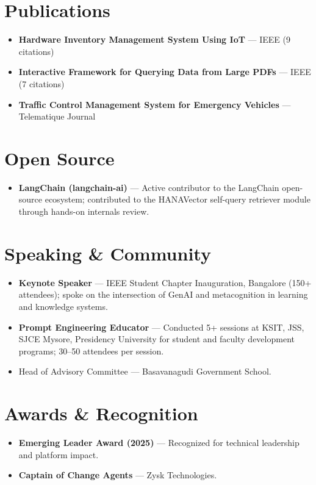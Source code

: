 \documentclass[letterpaper,11pt]{article}
\newcommand{\resumeItem}[1]{
  \item\small{
    {#1 \vspace{-2pt}}
  }
}
\newcommand{\resumeSubItem}[1]{\resumeItem{#1}\vspace{-4pt}}
\newcommand{\resumeSubHeadingListStart}{\begin{itemize}[leftmargin=0.15in, label={}]}
\newcommand{\resumeSubHeadingListEnd}{\end{itemize}}
\begin{document}
\section{Publications}
  \resumeSubHeadingListStart
    \resumeSubItem{\textbf{Hardware Inventory Management System Using IoT} --- IEEE (9 citations)}
    \resumeSubItem{\textbf{Interactive Framework for Querying Data from Large PDFs} --- IEEE (7 citations)}
    \resumeSubItem{\textbf{Traffic Control Management System for Emergency Vehicles} --- Telematique Journal}
  \resumeSubHeadingListEnd

\section{Open Source}
  \resumeSubHeadingListStart
    \resumeSubItem{\textbf{LangChain (langchain-ai)} --- Active contributor to the LangChain open-source ecosystem; contributed to the HANAVector self-query retriever module through hands-on internals review.}
  \resumeSubHeadingListEnd

\section{Speaking \& Community}
  \resumeSubHeadingListStart
    \resumeSubItem{\textbf{Keynote Speaker} --- IEEE Student Chapter Inauguration, Bangalore (150+ attendees); spoke on the intersection of GenAI and metacognition in learning and knowledge systems.}
    \resumeSubItem{\textbf{Prompt Engineering Educator} --- Conducted 5+ sessions at KSIT, JSS, SJCE Mysore, Presidency University for student and faculty development programs; 30--50 attendees per session.}
    \resumeSubItem{Head of Advisory Committee --- Basavanagudi Government School.}
  \resumeSubHeadingListEnd

\section{Awards \& Recognition}
  \resumeSubHeadingListStart
    \resumeSubItem{\textbf{Emerging Leader Award (2025)} --- Recognized for technical leadership and platform impact.}
    \resumeSubItem{\textbf{Captain of Change Agents} --- Zysk Technologies.}
  \resumeSubHeadingListEnd
\end{document}
